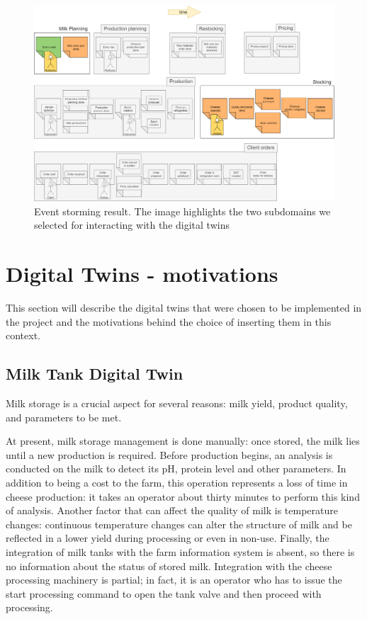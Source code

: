 \begin{figure}[H]
    \centering
    \includegraphics[width=\textwidth]{img/event-storming.png}
    \caption{Event storming result. The image highlights the two subdomains we selected for interacting with the digital twins}
    \label{img:event-storming}
\end{figure}

\section{Digital Twins - motivations}\label{sec:dt-motivations}
This section will describe the digital twins that were chosen to be implemented in the project and the motivations behind the choice of inserting them in this context.

\subsection{Milk Tank Digital Twin}
Milk storage is a crucial aspect for several reasons: milk yield, product quality, and parameters to be met.

At present, milk storage management is done manually: once stored, the milk lies until a new production is required.
Before production begins, an analysis is conducted on the milk to detect its pH, protein level and other parameters.
In addition to being a cost to the farm, this operation represents a loss of time in cheese production: it takes an operator about thirty minutes to
perform this kind of analysis.
Another factor that can affect the quality of milk is temperature changes: continuous temperature changes can alter the structure of milk and be 
reflected in a lower yield during processing or even in non-use.
Finally, the integration of milk tanks with the farm information system is absent, so there is no information about the status of stored milk.
Integration with the cheese processing machinery is partial; in fact, it is an operator who has to issue the start processing command to open the 
tank valve and then proceed with processing.


